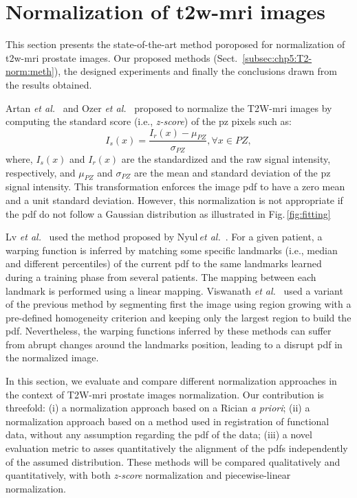\section{Normalization of \ac{t2w}-\ac{mri} images} \label{sec:chp5:T2-norm}
This section presents the state-of-the-art method poroposed for normalization of \ac{t2w}-\ac{mri} prostate images.
Our proposed methods (Sect.~\ref{subsec:chp5:T2-norm:meth}), the designed experiments and finally the conclusions drawn from the results obtained. 
 
Artan \textit{et al.}~\cite{Artan2010,Artan2009} and Ozer \textit{et al.}~\cite{Ozer2009,Ozer2010} proposed to normalize the T2W-\ac{mri} images by computing the standard score (i.e., \textit{z-score}) of the \ac{pz} pixels such as: 
\begin{equation}
  I_{s}(x) = \frac{I_{r}(x) - \mu_{PZ}}{\sigma_{PZ}}, \forall x\in PZ ,
  \label{eq:zscore}
\end{equation}
\noindent where, $I_{s}(x)$ and $I_{r}(x)$ are the standardized and the raw signal intensity, respectively, and $\mu_{PZ}$ and $\sigma_{PZ}$ are the mean and standard deviation of the \ac{pz} signal intensity. 
This transformation enforces the image \ac{pdf} to have a zero mean and a unit standard deviation.
However, this normalization is not appropriate if the \ac{pdf} do not follow a Gaussian distribution as illustrated in Fig.\,\ref{fig:fitting}

Lv \textit{et al.}~\cite{Lv2009} used the method proposed by Nyul\,\textit{et al.}~\cite{Nyul2000}.
For a given patient, a warping function is inferred by matching some specific landmarks (i.e., median and different percentiles) of the current \ac{pdf} to the same landmarks learned during a training phase from several patients. 
The mapping between each landmark is performed using a linear mapping.
Viswanath \textit{et al.}~\cite{Viswanath2012} used a variant of the previous method by segmenting first the image using region growing with a pre-defined homogeneity criterion and keeping only the largest region to build the \ac{pdf}.
Nevertheless, the warping functions inferred by these methods can suffer from abrupt changes around the landmarks position, leading to a disrupt \ac{pdf} in the normalized image.  

In this section, we evaluate and compare different normalization approaches in the context of T2W-\ac{mri} prostate images normalization.
Our contribution is threefold: (i) a normalization approach based on a Rician \textit{a priori}; (ii) a normalization approach based on a method used in registration of functional data, without any assumption regarding the \ac{pdf} of the data; (iii) a novel evaluation metric to asses quantitatively the alignment of the \acp{pdf} independently of the assumed distribution. 
These methods will be compared qualitatively and quantitatively, with both \textit{z-score} normalization and piecewise-linear normalization.


